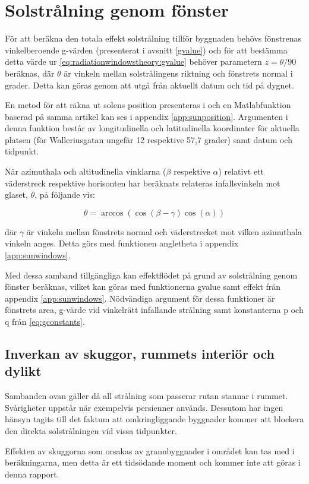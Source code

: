 \section{Solstrålning genom fönster}

För att beräkna den totala effekt solstrålning tillför byggnaden behövs fönstrenas vinkelberoende g-värden (presenterat i avsnitt \ref{gvalue}) och för att bestämma detta värde ur \eqref{eq:radiationwindowstheory:gvalue} behöver parametern $z = \theta/90$ beräknas, där $\theta$ är vinkeln mellan solstrålingens riktning och fönstrets normal i grader. Detta kan göras genom att utgå från aktuellt datum och tid på dygnet.

En metod för att räkna ut solens position presenteras i \cite{walraven78} och en Matlabfunktion baserad på samma artikel kan ses i appendix \ref{app:sunposition}. Argumenten i denna funktion består av longitudinella och latitudinella koordinater för aktuella platsen (för Walleriusgatan ungefär 12 respektive 57,7 grader) samt datum och tidpunkt.

När azimuthala och altitudinella vinklarna ($\beta$ respektive $\alpha$) relativt ett väderstreck respektive horisonten har beräknats relateras infallsvinkeln mot glaset, $\theta$, på följande vis:

\begin{equation} 
\theta = \arccos{\left( \cos{\left(\beta - \gamma\right)}\cos{\left(\alpha\right)}\right)}
\end{equation}

där $\gamma$ är vinkeln mellan fönstrets normal och väderstrecket mot vilken azimuthala vinkeln anges. Detta görs med funktionen angletheta i appendix \ref{app:sunwindows}.

Med dessa samband tillgängliga kan effektflödet på grund av solstrålning genom fönster beräknas, vilket kan göras med funktionerna gvalue samt effekt från appendix \ref{app:sunwindows}. Nödvändiga argument för dessa funktioner är fönstrets area, %
g-värde vid vinkelrätt infallande strålning %
samt konstanterna p och q från \eqref{eq:gconstants}.

\subsection{Inverkan av skuggor, rummets interiör och dylikt}

Sambanden ovan gäller då all strålning som passerar rutan stannar i rummet. Svårigheter uppstår när exempelvis persienner används. Dessutom har ingen hänsyn tagits till det faktum att omkringliggande byggnader kommer att blockera den direkta solstrålningen vid vissa tidpunkter.


Effekten av skuggorna som orsakas av grannbyggnader i området kan tas med i beräkningarna, men detta är ett tidsödande moment och kommer inte att göras i denna rapport.
